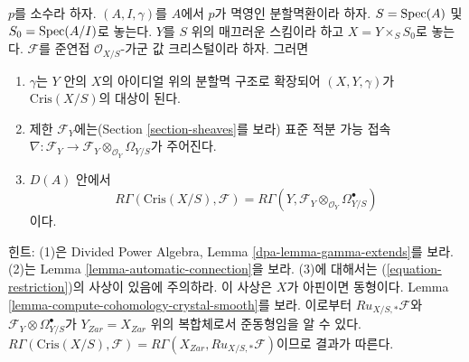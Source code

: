 \begin{remark}[비교]
\label{remark-comparison}
$p$를 소수라 하자. $(A, I, \gamma)$를 $A$에서 $p$가 멱영인
분할멱환이라 하자. $S = \mathop{\mathrm{Spec}}(A)$ 및 $S_0 = \mathop{\mathrm{Spec}}(A/I)$로 놓는다.
$Y$를 $S$ 위의 매끄러운 스킴이라 하고 $X = Y \times_S S_0$로
놓는다. $\mathcal{F}$를 준연접 $\mathcal{O}_{X/S}$-가군 값
크리스털이라 하자. 그러면
\begin{enumerate}
\item $\gamma$는 $Y$ 안의 $X$의 아이디얼 위의 분할멱 구조로
확장되어 $(X, Y, \gamma)$가 $\text{Cris}(X/S)$의 대상이 된다.
\item 제한 $\mathcal{F}_Y$에는(Section \ref{section-sheaves}를 보라)
표준 적분 가능 접속
$\nabla : \mathcal{F}_Y \to
\mathcal{F}_Y \otimes_{\mathcal{O}_Y} \Omega_{Y/S}$가 주어진다.
\item $D(A)$ 안에서
$$
R\Gamma(\text{Cris}(X/S), \mathcal{F}) =
R\Gamma(Y, \mathcal{F}_Y \otimes_{\mathcal{O}_Y} \Omega^\bullet_{Y/S})
$$
이다.
\end{enumerate}
힌트: (1)은 Divided Power Algebra, Lemma
\ref{dpa-lemma-gamma-extends}를 보라. (2)는 Lemma
\ref{lemma-automatic-connection}을 보라. (3)에 대해서는
(\ref{equation-restriction})의 사상이 있음에 주의하라. 이 사상은
$X$가 아핀이면 동형이다. Lemma
\ref{lemma-compute-cohomology-crystal-smooth}를 보라. 이로부터
$Ru_{X/S, *}\mathcal{F}$와
$\mathcal{F}_Y \otimes \Omega^\bullet_{Y/S}$가
$Y_{Zar} = X_{Zar}$ 위의 복합체로서 준동형임을 알 수 있다.
$R\Gamma(\text{Cris}(X/S), \mathcal{F}) =
R\Gamma(X_{Zar}, Ru_{X/S, *}\mathcal{F})$이므로 결과가 따른다.
\end{remark}

